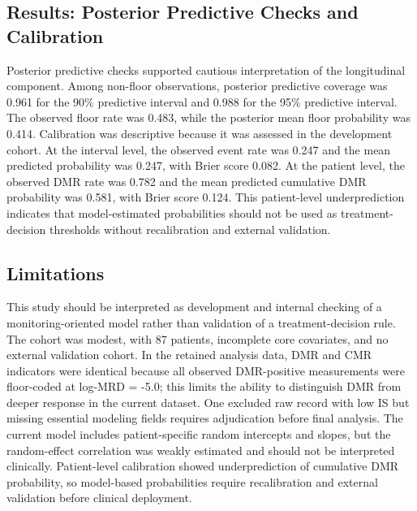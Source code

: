 \subsection*{Results: Posterior Predictive Checks and Calibration}

Posterior predictive checks supported cautious interpretation of the longitudinal component. Among non-floor observations, posterior predictive coverage was 0.961 for the 90\% predictive interval and 0.988 for the 95\% predictive interval. The observed floor rate was 0.483, while the posterior mean floor probability was 0.414. Calibration was descriptive because it was assessed in the development cohort. At the interval level, the observed event rate was 0.247 and the mean predicted probability was 0.247, with Brier score 0.082. At the patient level, the observed DMR rate was 0.782 and the mean predicted cumulative DMR probability was 0.581, with Brier score 0.124. This patient-level underprediction indicates that model-estimated probabilities should not be used as treatment-decision thresholds without recalibration and external validation.

\subsection*{Limitations}

This study should be interpreted as development and internal checking of a monitoring-oriented model rather than validation of a treatment-decision rule. The cohort was modest, with 87 patients, incomplete core covariates, and no external validation cohort. In the retained analysis data, DMR and CMR indicators were identical because all observed DMR-positive measurements were floor-coded at log-MRD = -5.0; this limits the ability to distinguish DMR from deeper response in the current dataset. One excluded raw record with low IS but missing essential modeling fields requires adjudication before final analysis. The current model includes patient-specific random intercepts and slopes, but the random-effect correlation was weakly estimated and should not be interpreted clinically. Patient-level calibration showed underprediction of cumulative DMR probability, so model-based probabilities require recalibration and external validation before clinical deployment.

